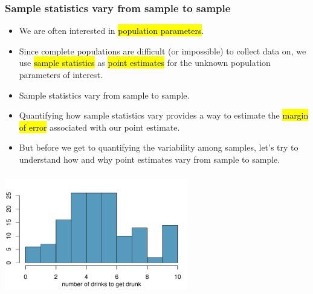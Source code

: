 \documentclass[11pt,containsverbatim,handout,xcolor=xelatex,dvipsnames,table]{beamer}
\begin{document}
\begin{frame}
\frametitle{Sample statistics vary from sample to sample}

\begin{itemize}

\item We are often interested in \hl{population parameters}.

\item Since complete populations are difficult (or impossible) to collect data on, we use \hl{sample statistics} as \hl{point estimates} for the unknown population parameters of interest.

\item Sample statistics vary from sample to sample.

\item Quantifying how sample statistics vary provides a way to estimate the \hl{margin of error} associated with our point estimate.

\item But before we get to quantifying the variability among samples, let's try to understand how and why point estimates vary from sample to sample.

\end{itemize}


\end{frame}


\begin{frame}
\frametitle{}


\begin{center}
\includegraphics[width=0.6\textwidth]{figures/no_drinks_drunk/hist_no_drinks_drunk_pop} 
\end{center}

\end{frame}
\end{document}
